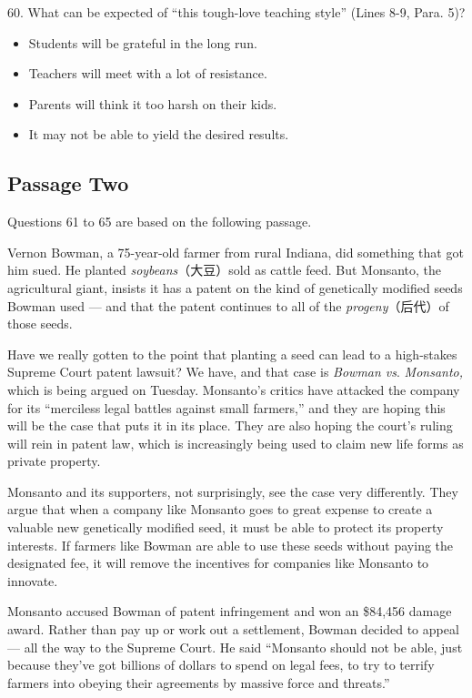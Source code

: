 \documentclass[UTF8,11pt]{ctexart}
\begin{document}
60. What can be expected of “this tough-love teaching style” (Lines 8-9, Para. 5)?


\begin{itemize}[leftmargin=2em,itemsep=.2em,topsep=.4em]\item[A.] Students will be grateful in the long run.
\item[B.] Teachers will meet with a lot of resistance.
\item[C.] Parents will think it too harsh on their kids.
\item[D.] It may not be able to yield the desired results.
\end{itemize}

\subsection*{Passage Two}


Questions 61 to 65 are based on the following passage.


Vernon Bowman, a 75-year-old farmer from rural Indiana, did something that got him sued. He planted\textit{ soybeans}（大豆）sold as cattle feed. But Monsanto, the agricultural giant, insists it has a patent on the kind of genetically modified seeds Bowman used — and that the patent continues to all of the\textit{ progeny}（后代）of those seeds.


Have we really gotten to the point that planting a seed can lead to a high-stakes Supreme Court patent lawsuit? We have, and that case is\textit{ Bowman vs}.\textit{ Monsanto,} which is being argued on Tuesday. Monsanto’s critics have attacked the company for its “merciless legal battles against small farmers,” and they are hoping this will be the case that puts it in its place. They are also hoping the court’s ruling will rein in patent law, which is increasingly being used to claim new life forms as private property.


Monsanto and its supporters, not surprisingly, see the case very differently. They argue that when a company like Monsanto goes to great expense to create a valuable new genetically modified seed, it must be able to protect its property interests. If farmers like Bowman are able to use these seeds without paying the designated fee, it will remove the incentives for companies like Monsanto to innovate.


Monsanto accused Bowman of patent infringement and won an \$84,456 damage award. Rather than pay up or work out a settlement, Bowman decided to appeal — all the way to the Supreme Court. He said “Monsanto should not be able, just because they’ve got billions of dollars to spend on legal fees, to try to terrify farmers into obeying their agreements by massive force and threats.”
\end{document}
